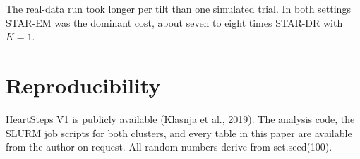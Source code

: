 \documentclass[12pt]{article}
\begin{document}
The real-data run took longer per tilt than one simulated trial. In both settings STAR-EM was the dominant cost, about seven to eight times STAR-DR with $K=1$.

\section{Reproducibility}

HeartSteps V1 is publicly available (Klasnja et al., 2019). The analysis code, the SLURM job scripts for both clusters, and every table in this paper are available from the author on request. All random numbers derive from set.seed(100).
\end{document}
